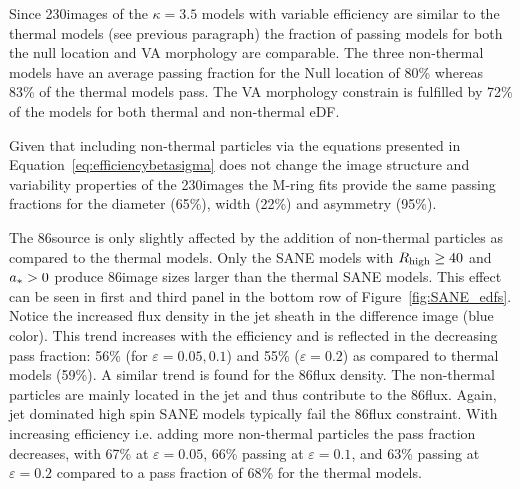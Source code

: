 
Since 230\GHz images of the $\kappa=3.5$ models with variable efficiency are similar to the thermal models (see previous paragraph) the fraction of passing models for both the null location and VA morphology are comparable.
The three non-thermal models have an average passing fraction for the Null location of 80\% whereas 83\% of the thermal models pass.
The VA morphology constrain is fulfilled by 72\% of the models for both thermal and non-thermal eDF.


Given that including non-thermal particles via the equations presented in Equation~\ref{eq:efficiencybetasigma} does not change the image structure and variability properties of the 230\GHz images the M-ring fits provide the same passing fractions for the diameter (65\%), width (22\%) and asymmetry (95\%).


The 86\GHz source is only slightly affected by the addition of non-thermal particles as compared to the thermal models.
Only the SANE models with $R_\mathrm{high} \geq 40$ and $a_* > 0$ produce 86\GHz image sizes larger than the thermal SANE models.
This effect can be seen in  first and third panel in the bottom row of Figure~\ref{fig:SANE_edfs}.
Notice the increased flux density in the jet sheath in the difference image (blue color).
This trend increases with the efficiency and is reflected in the decreasing pass fraction: 56\% (for $\varepsilon=0.05,0.1$) and 55\% ($\varepsilon=0.2$) as compared to thermal models (59\%).
A similar trend is found for the 86\GHz flux density.
The non-thermal particles are mainly located in the jet and thus contribute to the 86\GHz flux.
Again, jet dominated high spin SANE models typically fail the 86\GHz flux constraint.
With increasing efficiency i.e.
adding more non-thermal particles the pass fraction decreases, with 67\%  at $\varepsilon=0.05$, 66\% passing at $\varepsilon=0.1$, and 63\% passing at  $\varepsilon=0.2$ compared to a pass fraction of 
68\% for the thermal models.

